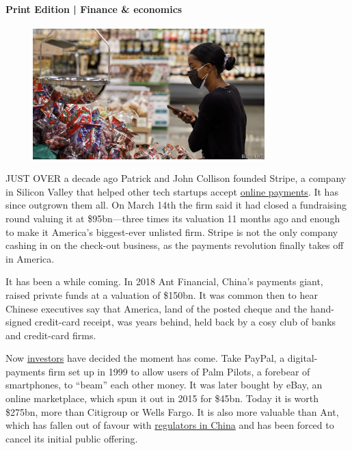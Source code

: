 \documentclass{article}
\begin{document}
\paragraph{Print Edition | Finance \& economics  \quad \color{gray}{Mar 25th 2021 }}
\begin{figure}[h]
\centering
\includegraphics[width=0.8\textwidth]{images/20210320_fnp504_0.jpg}
\end{figure}
\lettrine{J}UST OVER a decade ago Patrick and John Collison founded Stripe, a company in Silicon Valley that helped other tech startups accept \href{/finance-and-economics/2020/10/08/how-the-digital-surge-will-reshape-finance}{online payments}. It has since outgrown them all. On March 14th the firm said it had closed a fundraising round valuing it at \$95bn---three times its valuation 11 months ago and enough to make it America's biggest-ever unlisted firm. Stripe is not the only company cashing in on the check-out business, as the payments revolution finally takes off in America. 

It has been a while coming. In 2018 Ant Financial, China's payments giant, raised private funds at a valuation of \$150bn. It was common then to hear Chinese executives say that America, land of the posted cheque and the hand-signed credit-card receipt, was years behind, held back by a cosy club of banks and credit-card firms. 

Now \href{/finance-and-economics/2020/12/16/what-explains-investors-enthusiasm-for-risky-assets}{investors} have decided the moment has come. Take PayPal, a digital-payments firm set up in 1999 to allow users of Palm Pilots, a forebear of smartphones, to ``beam'' each other money. It was later bought by eBay, an online marketplace, which spun it out in 2015 for \$45bn. Today it is worth \$275bn, more than Citigroup or Wells Fargo. It is also more valuable than Ant, which has fallen out of favour with \href{/finance-and-economics/2021/03/13/chinas-government-is-cracking-down-on-fintech-what-does-it-want}{regulators in China} and has been forced to cancel its initial public offering. 
\end{document}
